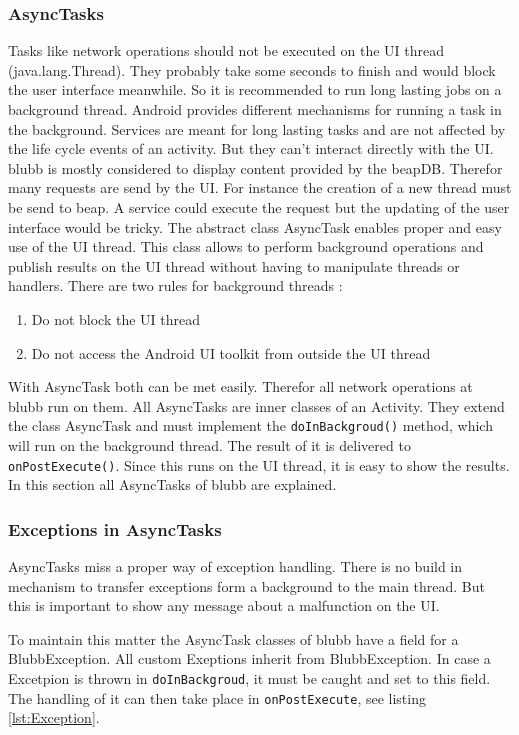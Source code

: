 \documentclass[12pt,a4paper,oneside]{report}
\newcommand{\appname}{blubb}
\newcommand{\beapDB}{beapDB}
\newcommand{\code}[1]{\lstinline{#1}}
\begin{document}
\subsubsection{AsyncTasks}
Tasks like network operations should not be executed on the UI thread (java.lang.Thread). They probably take some seconds to finish and would block the user interface meanwhile. So it is recommended to run long lasting jobs on a background thread. 
Android provides different mechanisms for running a task in the background.
Services are meant for long lasting tasks and are not affected by the life cycle events of an activity. But they can't interact directly with the UI. \\
\appname{} is mostly considered to display content provided by the \beapDB{}. Therefor many requests are send by the UI. For instance the creation of a new thread must be send to beap. A service could execute the request but the updating of the user interface would be tricky. The abstract class AsyncTask enables proper and easy use of the UI thread. This class allows to perform background operations and publish results on the UI thread without having to manipulate threads or handlers\citep{aDefAsyncTask}.
There are two rules for background threads
\citep{aDefProcThreads}:
\begin{enumerate}
	\item Do not block the UI thread
	\item Do not access the Android UI toolkit from outside the UI thread
\end{enumerate}
With AsyncTask both can be met easily. Therefor all network operations at \appname{} run on them. All AsyncTasks are inner classes of an Activity. They extend the class AsyncTask and must implement the \code{doInBackgroud()} method, which will run on the background thread. The result of it is delivered to \code{onPostExecute()}. Since this runs on the UI thread, it is easy to show the results. In this section all AsyncTasks of \appname{} are explained.

\subsubsection{Exceptions in AsyncTasks}
AsyncTasks miss a proper way of exception handling. There is no build in mechanism to transfer exceptions form a background to the main thread. But this is important to show any message about a malfunction on the UI.

 To maintain this matter the AsyncTask classes of \appname{} have a field for a BlubbException. All custom Exeptions inherit from BlubbException. In case a Excetpion is thrown in \code{doInBackgroud}, it must be caught and set to this field. The handling of it can then take place in \code{onPostExecute}, see listing \ref{lst:Exception}.
\end{document}
